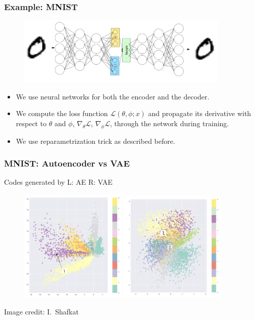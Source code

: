 \documentclass[handout,aspectratio=169]{beamer}
\begin{document}
\begin{frame}
  \frametitle{Example: MNIST}

  \begin{figure}
    \centering
    \includegraphics[width=4in]{pics/mnist-vae.png}
  \end{figure}
  
  \begin{itemize}
  \item We use neural networks for both the encoder and the decoder.
    \item We compute the loss function  $\mathcal L(\theta, \phi ; x)$ and propagate its derivative with respect to $\theta$ and $\phi$,  $\nabla_\theta \mathcal L$,  $\nabla_\phi \mathcal L$, through the network during training. 
    \item We use reparametrization trick as described before.
  \end{itemize}
 \end{frame}



\begin{frame}
  \frametitle{MNIST: Autoencoder vs VAE}

Codes generated by L: AE R: VAE
\begin{figure}
\includegraphics[width=2in]{pics/mnist-ae}
\includegraphics[width=2in]{pics/mnist-vae-c}
\end{figure}

  {\tiny Image credit: I.~Shafkat}
\end{frame}
\end{document}
